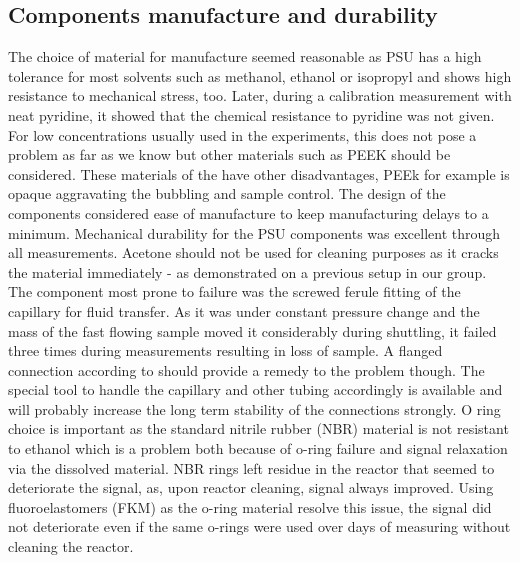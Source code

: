         \subsection{Components manufacture and durability}
        \label{sec:discussion:componentsAndDurability}
            The choice of material for manufacture seemed reasonable as PSU has a high tolerance for most solvents such as methanol, ethanol or isopropyl and shows high resistance to mechanical stress, too. Later, during a calibration measurement with neat pyridine, it showed that the chemical resistance to pyridine was not given. For low concentrations usually used in the experiments, this does not pose a problem as far as we know but other materials such as PEEK should be considered. These materials of the have other disadvantages, PEEk for example is opaque aggravating the bubbling and sample control. The design of the components considered ease of manufacture to keep manufacturing delays to a minimum.
            Mechanical durability for the PSU components was excellent through all measurements. Acetone should not be used for cleaning purposes as it cracks the material immediately - as demonstrated on a previous setup in our group. The component most prone to failure was the screwed ferule fitting of the capillary for fluid transfer. As it was under constant pressure change and the mass of the fast flowing sample moved it considerably during shuttling, it failed three times during measurements resulting in loss of sample. A flanged connection according to \cite{noauthor_finemech_nodate} should provide a remedy to the problem though. The special tool to handle the capillary and other tubing accordingly is available and will probably increase the long term stability of the connections strongly.
            O ring choice is important as the standard nitrile rubber (NBR) material is not resistant to ethanol which is a problem both because of o-ring failure and signal relaxation via the dissolved material. NBR rings left residue in the reactor that seemed to deteriorate the signal, as, upon reactor cleaning, signal always improved. Using fluoroelastomers (FKM) as the o-ring material resolve this issue, the signal did not deteriorate even if the same o-rings were used over days of measuring without cleaning the reactor.
